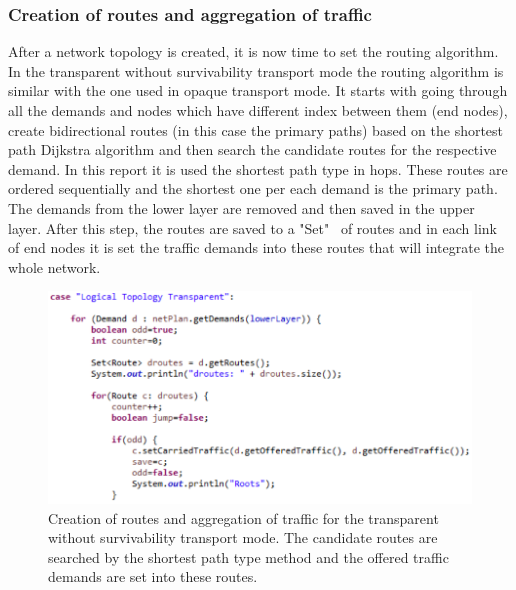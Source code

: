 \subsubsection{Creation of routes and aggregation of traffic}

\vspace{11pt}
After a network topology is created, it is now time to set the routing algorithm. In the transparent without survivability transport mode the routing algorithm is similar with the one used in opaque transport mode. It starts with going through all the demands and nodes which have different index between them (end nodes), create bidirectional routes (in this case the primary paths) based on the shortest path Dijkstra algorithm and then search the candidate routes for the respective demand. In this report it is used the shortest path type in hops. These routes are ordered sequentially and the shortest one per each demand is the primary path. The demands from the lower layer are removed and then saved in the upper layer. After this step, the routes are saved to a "Set" \ of routes and in each link of end nodes it is set the traffic demands into these routes that will integrate the whole network.

\begin{figure}[H]
\centering
\includegraphics[width=14cm]{sdf/heuristic/transparent_survivability/figures/grooming_transparent_surv1}
\caption{Creation of routes and aggregation of traffic for the transparent without survivability transport mode. The candidate routes are searched by the shortest path type method and the offered traffic demands are set into these routes.}
\label{grooming_transparent_surv1}
\end{figure}

